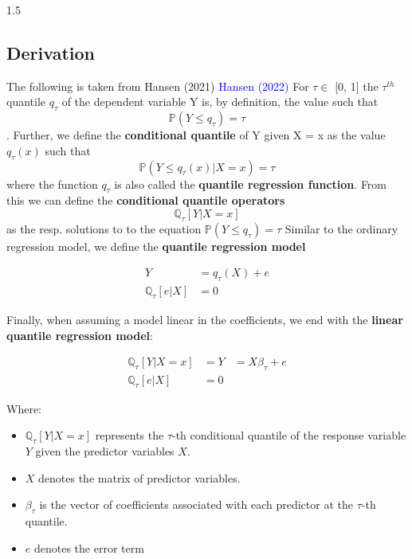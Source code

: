 \documentclass[conference]{IEEEtran}
\begin{document}
\begin{spacing}{1.5}
\subsection{\textbf{Derivation}}

The following is taken from Hansen (2021) \textcolor{blue}{Hansen (2022)}
For $\tau \in$ [0, 1] the $\tau^{th}$ quantile $q_{\tau}$ of the dependent variable Y is, by definition, the value such that 
\begin{equation}
\mathbb{P}(Y \leq q_{\tau}) = \tau
\end{equation}.
Further, we define the \textbf{conditional quantile} of Y given X = x as the value $q_{\tau}(x)$ such that 
\begin{equation}
\mathbb{P}(Y \leq q_{\tau}(x) | X = x) = \tau
\end{equation}where the function $q_{\tau}$ is also called the \textbf{quantile regression function}. 
From this we can define the \textbf{conditional quantile operators}
\begin{equation}
 \mathbb{Q}_{\tau}[Y | X = x]
 \end{equation}
  as the resp. solutions to to the equation $\mathbb{P}(Y \leq q_{\tau}) = \tau$
Similar to the ordinary regression model, we define the \textbf{quantile regression model}

\begin{equation}
\begin{aligned}
Y &= q_{\tau}(X) + e \\
\mathbb{Q}_{\tau}[e | X] &= 0
\end{aligned}
\end{equation}

Finally, when assuming a model linear in the coefficients, we end with the \textbf{linear quantile regression model}:

\begin{equation}
\begin{aligned}
\mathbb{Q}_{\tau}[Y | X = x] &= Y&= X \beta_{\tau} + e \\
\mathbb{Q}_{\tau}[e | X] &= 0
\end{aligned}
\end{equation}

Where:
\begin{itemize}
  \item $\mathbb{Q}_{\tau}[Y | X = x] $ represents the $\tau$-th conditional quantile of the response variable $Y$ given the predictor variables $X$.
  \item $X$ denotes the matrix of predictor variables.
  \item $\beta_{\tau}$ is the vector of coefficients associated with each predictor at the $\tau$-th quantile.
  \item $e$ denotes the error term
\end{itemize}


\end{spacing}
\end{document}
